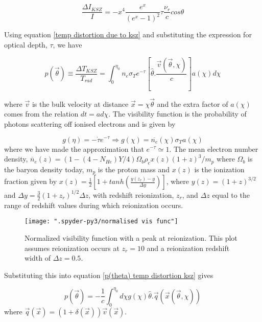 \documentclass[12pt]{article}
\begin{document}
\begin{equation}
\frac{\Delta I_{KSZ}}{I}=-x^4 \frac{e^x}{(e^x-1)^2}\tau \frac{\nu_r}{c}cos\theta
\end{equation}

Using equation \ref{temp distortion due to ksz} and substituting the expression for optical depth, $\tau$, we have 

\begin{equation}\label{p(theta) temp distortion ksz}
p(\vec{\theta})\equiv \frac{\Delta T_{KSZ}}{T_{rad}}=\int_{0}^{\eta_0}n_e\sigma_Te^{-\tau}\left[\hat{\theta}.\frac{\vec{v}(\vec{\theta},\chi)}{c}\right]a(\chi)d\chi
\end{equation}

where $\vec{v}$ is the bulk velocity at distance $\vec{x}=\chi\vec{\theta}$ and the extra factor of $a(\chi)$ comes from the relation $dt=ad\chi$. 
The visibility function is the probability of photons scattering off ionised electrons and is given by

\begin{equation}
g(\eta)=-\dot{\tau}e^{-\tau} \Rightarrow g(\chi)= \overline{n_e}(\chi) \sigma_Ta(\chi)
\end{equation} 
where we have made the approximation that $e^{-\tau} \simeq 1$. The mean electron number density, $\overline{n}_e(z)=(1-(4-N_{He})Y/4)\Omega_b\rho_c x(z)(1+z)^3/m_p$ where $\Omega_b$ is the baryon density today, $m_p$ is the proton mass and $x(z)$ is the ionization fraction given by $x(z)=\frac{1}{2}\left[1+tanh\left(\frac{y(z_r)-y}{\Delta y}\right)\right]$, where $y(z)=(1+z)^{3/2}$ and $\Delta y=\frac{3}{2}(1+z_r)^{1/2} \Delta z$, with redshift reionization, $z_r$, and $\Delta z$ equal to the range of redshift values during which reionization occurs. 

\begin{figure}[h!]
	\centering
	\texttt{[image: ".spyder-py3/normalised vis func"]}
	\caption{Normalized visibility function with a peak at reionization. This plot assumes reionization occurs at $z_r=10$ and a reionization redshift width of $\Delta z=0.5$.}
	\label{fig:normalised-vis-func}
\end{figure}



Substituting this into equation \ref{p(theta) temp distortion ksz} gives

\begin{equation}
p(\vec{\theta})=-\frac{1}{c}\int_{0}^{\eta_0} d\chi g(\chi)\hat{\theta}.\vec{q}(\vec{x}(\vec{\theta},\chi))
\end{equation}
where $\vec{q}(\vec{x})=(1+\delta(\vec{x}))\vec{v}(\vec{x})$. 
\end{document}
